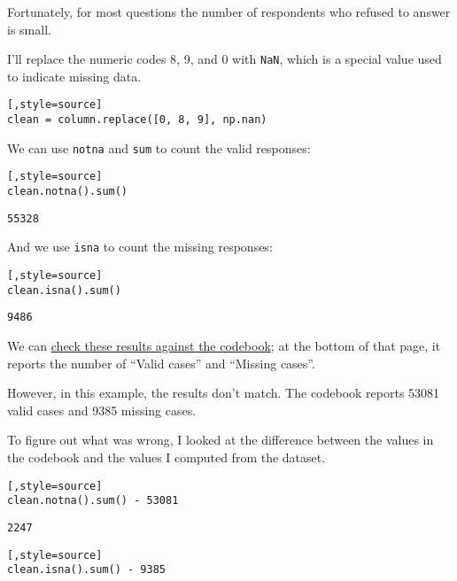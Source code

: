 Fortunately, for most questions the number of respondents who refused to
answer is small.

I'll replace the numeric codes 8, 9, and 0 with
\passthrough{\lstinline!NaN!}, which is a special value used to indicate
missing data.

\begin{lstlisting}[,style=source]
clean = column.replace([0, 8, 9], np.nan)
\end{lstlisting}

We can use \passthrough{\lstinline!notna!} and
\passthrough{\lstinline!sum!} to count the valid responses:

\begin{lstlisting}[,style=source]
clean.notna().sum()
\end{lstlisting}

\begin{lstlisting}[style=output]
55328
\end{lstlisting}

And we use \passthrough{\lstinline!isna!} to count the missing
responses:

\begin{lstlisting}[,style=source]
clean.isna().sum()
\end{lstlisting}

\begin{lstlisting}[style=output]
9486
\end{lstlisting}

We can
\href{https://gssdataexplorer.norc.org/projects/52787/variables/178/vshow}{check
these results against the codebook}; at the bottom of that page, it
reports the number of ``Valid cases'' and ``Missing cases''.

However, in this example, the results don't match. The codebook reports
53081 valid cases and 9385 missing cases.

To figure out what was wrong, I looked at the difference between the
values in the codebook and the values I computed from the dataset.

\begin{lstlisting}[,style=source]
clean.notna().sum() - 53081
\end{lstlisting}

\begin{lstlisting}[style=output]
2247
\end{lstlisting}

\begin{lstlisting}[,style=source]
clean.isna().sum() - 9385
\end{lstlisting}

